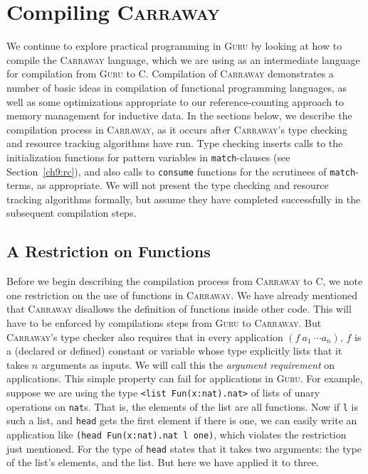 \documentclass{book}[12pt]
\newcommand{\guru}[0]{\textsc{Guru}\xspace}
\newcommand{\carraway}[0]{\textsc{Carraway}\xspace}
\begin{document}
\chapter{Compiling \carraway}

We continue to explore practical programming in \guru by looking at
how to compile the \carraway language, which we are using as an
intermediate language for compilation from \guru to C.  Compilation of
\carraway demonstrates a number of basic ideas in compilation of
functional programming languages, as well as some optimizations
appropriate to our reference-counting approach to memory management
for inductive data.  In the sections below, we describe the
compilation process in \carraway, as it occurs after \carraway's type
checking and resource tracking algorithms have run.  Type checking
inserts calls to the initialization functions for pattern variables in
\texttt{match}-clauses (see Section~\ref{ch9:rc}), and also calls to
\texttt{consume} functions for the scrutinees of \texttt{match}-terms,
as appropriate.  We will not present the type checking and resource
tracking algorithms formally, but assume they have completed
successfully in the subsequent compilation steps.

\section{A Restriction on Functions}

Before we begin describing the compilation process from \carraway to
C, we note one restriction on the use of functions in \carraway.  We
have already mentioned that \carraway disallows the definition of
functions inside other code.  This will have to be enforced by
compilations steps from \guru to \carraway.  But \carraway's type
checker also requires that in every application $(f\ a_1\ \cdots
a_n)$, $f$ is a (declared or defined) constant or variable whose type
explicitly lists that it takes $n$ arguments as inputs.  We will call
this the \emph{argument requirement} on applications.  This simple
property can fail for applications in \guru.  For example, suppose we
are using the type \texttt{<list Fun(x:nat).nat>} of lists of unary
operations on \texttt{nat}s.  That is, the elements of the list are
all functions.  Now if \texttt{l} is such a list, and \texttt{head}
gets the first element if there is one, we can easily write an
application like \texttt{(head Fun(x:nat).nat l one)}, which violates
the restriction just mentioned.  For the type of \texttt{head} states
that it takes two arguments: the type of the list's elements, and the
list.  But here we have applied it to three.
\end{document}
